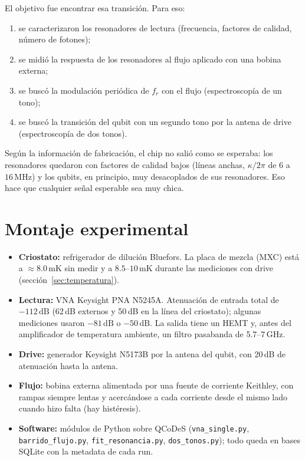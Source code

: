 \documentclass[11pt,a4paper]{article}
\newcommand{\MHz}{\,\mathrm{MHz}}
\newcommand{\mK}{\,\mathrm{mK}}
\newcommand{\dB}{\,\mathrm{dB}}
\newcommand{\fr}{f_r}
\begin{document}
El objetivo fue encontrar esa transición. Para eso:
\begin{enumerate}
  \item se caracterizaron los resonadores de lectura (frecuencia, factores de calidad, número de fotones);
  \item se midió la respuesta de los resonadores al flujo aplicado con una bobina externa;
  \item se buscó la modulación periódica de $\fr$ con el flujo (espectroscopía de un tono);
  \item se buscó la transición del qubit con un segundo tono por la antena de drive (espectroscopía de dos tonos).
\end{enumerate}

Según la información de fabricación, el chip no salió como se esperaba: los resonadores quedaron con factores de
calidad bajos (líneas anchas, $\kappa/2\pi$ de 6 a $16\MHz$) y los qubits, en principio, muy desacoplados de sus
resonadores. Eso hace que cualquier señal esperable sea muy chica.

\section{Montaje experimental}

\begin{itemize}
  \item \textbf{Criostato:} refrigerador de dilución Bluefors. La placa de mezcla (MXC) está a $\approx 8.0\mK$ sin
    medir y a $8.5$--$10\mK$ durante las mediciones con drive (sección~\ref{sec:temperatura}).
  \item \textbf{Lectura:} VNA Keysight PNA N5245A. Atenuación de entrada total de $-112\dB$ (62\,dB externos y
    50\,dB en la línea del criostato); algunas mediciones usaron $-81\dB$ o $-50\dB$. La salida tiene un HEMT y,
    antes del amplificador de temperatura ambiente, un filtro pasabanda de 5.7--7\,GHz.
  \item \textbf{Drive:} generador Keysight N5173B por la antena del qubit, con 20\,dB de atenuación hasta la antena.
  \item \textbf{Flujo:} bobina externa alimentada por una fuente de corriente Keithley, con rampas siempre lentas y
    acercándose a cada corriente desde el mismo lado cuando hizo falta (hay histéresis).
  \item \textbf{Software:} módulos de Python sobre QCoDeS (\texttt{vna\_single.py}, \texttt{barrido\_flujo.py},
    \texttt{fit\_resonancia.py}, \texttt{dos\_tonos.py}); todo queda en bases SQLite con la metadata de cada run.
\end{itemize}
\end{document}
